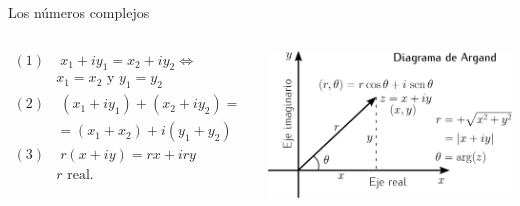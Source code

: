 \documentclass[9pt, aspectratio=169]{beamer}
\begin{document}
\begin{frame}{Los números complejos}
\begin{columns}[t]
  \begin{align*}
   (1)&\; x_1 + i y_1 = x_2 + i y_2 \Leftrightarrow \\
   \quad& x_1 = x_2 \text{ y } y_1 = y_2 \\
   (2)&\; (x_1 + i y_1) + (x_2 + i y_2) = \\
   \quad& = (x_1 + x_2) + i (y_1 + y_2) \\
   (3)&\; r(x + i y) = r x + i r y \\
   \quad& r \text{ real.} \\
  \end{align*}
  \begin{center}
    \includegraphics[width=1.0\textwidth]{figs/argand.pdf}
  \end{center}
\end{columns}
\end{frame}
\end{document}
